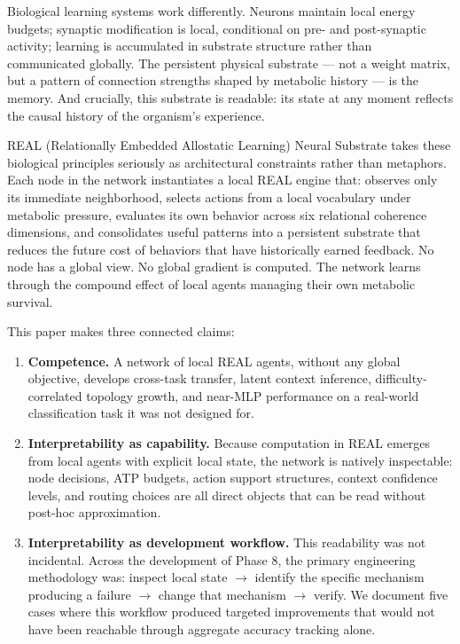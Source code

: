 \documentclass[letterpaper]{article}
\begin{document}
Biological learning systems work differently. Neurons maintain local energy budgets; synaptic modification is local, conditional on pre- and post-synaptic activity; learning is accumulated in substrate structure rather than communicated globally. The persistent physical substrate — not a weight matrix, but a pattern of connection strengths shaped by metabolic history — is the memory. And crucially, this substrate is readable: its state at any moment reflects the causal history of the organism's experience.

REAL (Relationally Embedded Allostatic Learning) Neural Substrate takes these biological principles seriously as architectural constraints rather than metaphors. Each node in the network instantiates a local REAL engine that: observes only its immediate neighborhood, selects actions from a local vocabulary under metabolic pressure, evaluates its own behavior across six relational coherence dimensions, and consolidates useful patterns into a persistent substrate that reduces the future cost of behaviors that have historically earned feedback. No node has a global view. No global gradient is computed. The network learns through the compound effect of local agents managing their own metabolic survival.

This paper makes three connected claims:
\begin{enumerate}
    \item \textbf{Competence.} A network of local REAL agents, without any global objective, develops cross-task transfer, latent context inference, difficulty-correlated topology growth, and near-MLP performance on a real-world classification task it was not designed for.
    \item \textbf{Interpretability as capability.} Because computation in REAL emerges from local agents with explicit local state, the network is natively inspectable: node decisions, ATP budgets, action support structures, context confidence levels, and routing choices are all direct objects that can be read without post-hoc approximation.
    \item \textbf{Interpretability as development workflow.} This readability was not incidental. Across the development of Phase 8, the primary engineering methodology was: inspect local state $\rightarrow$ identify the specific mechanism producing a failure $\rightarrow$ change that mechanism $\rightarrow$ verify. We document five cases where this workflow produced targeted improvements that would not have been reachable through aggregate accuracy tracking alone.
\end{enumerate}
\end{document}
